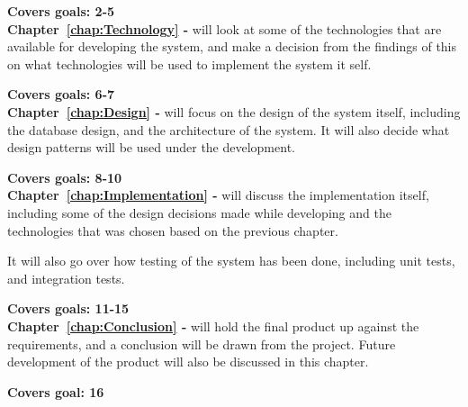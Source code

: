 \textbf{Covers goals: 2-5}\\

\textbf{Chapter~\ref{chap:Technology} - } will look at some of the technologies that are available for developing the system, and make a decision from the findings of this on what technologies will be used to implement the system it self.

\textbf{Covers goals: 6-7}\\

\textbf{Chapter~\ref{chap:Design} - } will focus on the design of the system itself, including the database design, and the architecture of the system. It will also decide what design patterns will be used under the development.

\textbf{Covers goals: 8-10}\\

\textbf{Chapter~\ref{chap:Implementation} - } will discuss the implementation itself, including some of the design decisions made while developing and the technologies that was chosen based on the previous chapter.

It will also go over how testing of the system has been done, including unit
tests, and integration tests.

\textbf{Covers goals: 11-15}\\


\textbf{Chapter~\ref{chap:Conclusion} - } will hold the final product up against the requirements, and a conclusion will be drawn from the project. Future development of the product will also be discussed in this chapter.

\textbf{Covers goal: 16}
